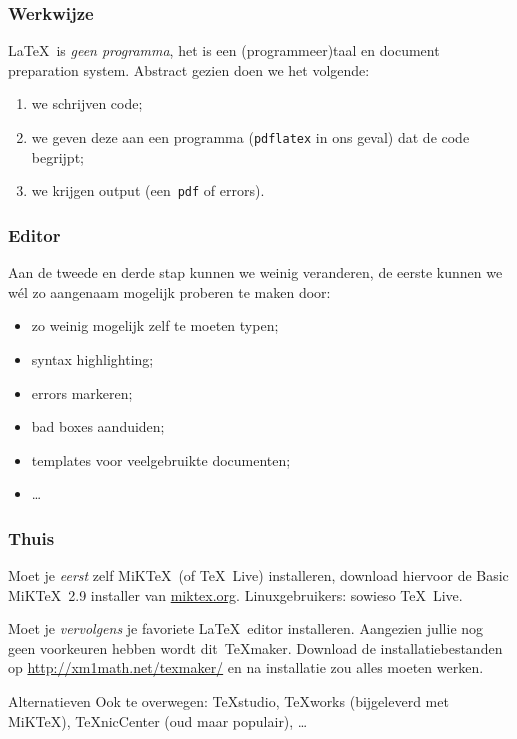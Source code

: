 \begin{frame}
  \frametitle{Werkwijze}

  \LaTeX~is \emph{geen programma}, het is een (programmeer)taal en document preparation system. Abstract gezien doen we het volgende:
  \begin{enumerate}
    \item we schrijven code;
    \item we geven deze aan een programma (\texttt{pdflatex} in ons geval) dat de code begrijpt;
    \item we krijgen output (een~\texttt{pdf} of errors).
  \end{enumerate}
\end{frame}

\begin{frame}
  \frametitle{Editor}

  Aan de tweede en derde stap kunnen we weinig veranderen, de eerste kunnen we w\'el zo aangenaam mogelijk proberen te maken door:
  \begin{itemize}
    \item zo weinig mogelijk zelf te moeten typen;
    \item syntax highlighting;
    \item errors markeren;
	  \item bad boxes aanduiden;
    \item templates voor veelgebruikte documenten;
    \item \ldots
  \end{itemize}
\end{frame}

\begin{frame}
  \frametitle{Thuis}

  Moet je \emph{eerst} zelf MiK\TeX~(of \TeX\ Live) installeren, download hiervoor de Basic MiK\TeX~2.9 installer van \href{http://miktex.org/2.9/setup}{miktex.org}. Linuxgebruikers: sowieso \TeX\ Live.

  Moet je \emph{vervolgens} je favoriete \LaTeX~editor installeren. Aangezien jullie nog geen voorkeuren hebben wordt dit~\TeX maker. Download de installatiebestanden op \url{http://xm1math.net/texmaker/} en na installatie zou alles moeten werken.
  \pause
  \begin{exampleblock}{Alternatieven}
    Ook te overwegen: \TeX studio, \TeX works (bijgeleverd met MiK\TeX), \TeX nicCenter (oud maar populair), \ldots
  \end{exampleblock}
\end{frame}

